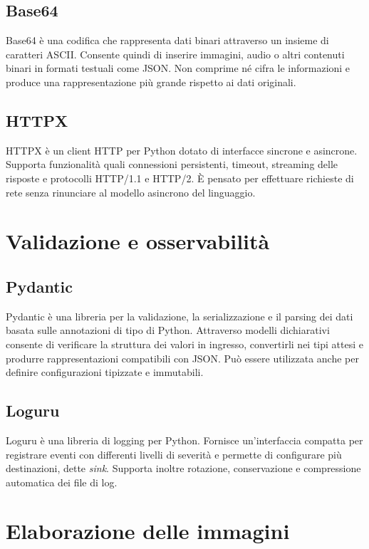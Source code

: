 \subsection{Base64}
Base64 è una codifica che rappresenta dati binari attraverso un insieme di
caratteri ASCII. Consente quindi di inserire immagini, audio o altri contenuti
binari in formati testuali come JSON. Non comprime né cifra le informazioni e
produce una rappresentazione più grande rispetto ai dati originali.

\subsection{HTTPX}
HTTPX è un client HTTP per Python dotato di interfacce sincrone e asincrone.
Supporta funzionalità quali connessioni persistenti, timeout, streaming delle
risposte e protocolli HTTP/1.1 e HTTP/2. È pensato per effettuare richieste di
rete senza rinunciare al modello asincrono del linguaggio.

\section{Validazione e osservabilità}

\subsection{Pydantic}
Pydantic è una libreria per la validazione, la serializzazione e il parsing dei
dati basata sulle annotazioni di tipo di Python. Attraverso modelli dichiarativi
consente di verificare la struttura dei valori in ingresso, convertirli nei
tipi attesi e produrre rappresentazioni compatibili con JSON. Può essere
utilizzata anche per definire configurazioni tipizzate e immutabili.

\subsection{Loguru}
Loguru è una libreria di logging per Python. Fornisce un'interfaccia compatta
per registrare eventi con differenti livelli di severità e permette di
configurare più destinazioni, dette \textit{sink}. Supporta inoltre rotazione,
conservazione e compressione automatica dei file di log.

\section{Elaborazione delle immagini}

